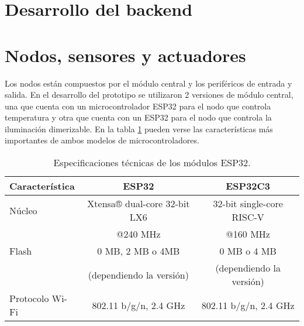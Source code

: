 \section{Desarrollo del backend}



\section{Nodos, sensores y actuadores}

Los nodos están compuestos por el módulo central y los periféricos de entrada y salida. En el desarrollo del prototipo se utilizaron 2 versiones de módulo central, una que cuenta con un microcontrolador ESP32 para el nodo que controla temperatura y otra que cuenta con un ESP32 para el nodo que controla la iluminación dimerizable. En la tabla \ref{tab:esp32} pueden verse las características más importantes de ambos modelos de microcontroladores.

\begin{table}[h]
\centering
\caption[Módulos ESP32]{Especificaciones técnicas de los módulos ESP32.}
\begin{tabular}{l c c}
\toprule
\textbf{Característica} & \textbf{ESP32} & \textbf{ESP32C3}\\
\midrule
Núcleo			& Xtensa® dual-core 32-bit LX6 	& 32-bit single-core RISC-V \\
				& @240 MHz						& @160 MHz \\
Flash			& 0 MB, 2 MB o 4MB				& 0 MB o 4 MB \\
				& (dependiendo la versión)		& (dependiendo la versión) \\
Protocolo Wi-Fi	& 802.11 b/g/n, 2.4 GHz			& 802.11 b/g/n, 2.4 GHz \\
\bottomrule
\hline
\end{tabular}
\label{tab:esp32}
\end{table}

